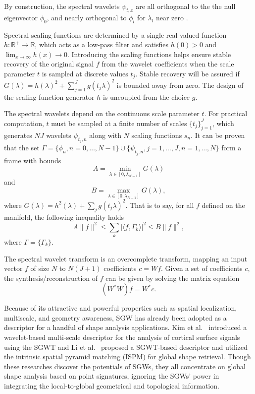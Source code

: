 By construction, the spectral wavelets $\psi_{t,x}$ are all orthogonal to the the null eigenvector $\phi_0$,
and nearly orthogonal to $\phi_l$ for $\lambda_l$ near zero \cite{Hammond2011}.

Spectral scaling functions are determined by a single real valued function $h:\mathbb{R}^+\to\mathbb{R}$,
which acts as a low-pass filter and satisfies $h(0)>0$ and $\lim_{x\to\infty}h(x)\to 0$.
Introducing the scaling functions helps ensure stable recovery of the original signal $f$ from the wavelet
coefficients when the scale parameter $t$ is sampled at discrete values ${t_j}$.
Stable recovery will be assured if $G(\lambda)=h(\lambda)^2+\sum_{j=1}^J g(t_j\lambda)^2$ is
bounded away from zero. The design of the scaling function generator $h$ is uncoupled from the choice $g$.

The spectral wavelets depend on the continuous scale parameter $t$. For practical computation,
$t$ must be sampled at a finite number of scales $\{t_j\}_{j=1}^J$, which generates
$NJ$ wavelets $\psi_{t_j,n}$ along with $N$ scaling functions $s_n$. It can be proven~\cite{Hammond2011}
that the set $\Gamma=\{\phi_n,n=0,\ldots,N-1\}\cup\{\psi_{t_j,n},j=1,\ldots,J,n=1,\ldots,N\}$
form a frame with bounds
\begin{equation*}
A=\min_{\lambda\in[0,\lambda_{N-1}]}G(\lambda)
\end{equation*}
and
\begin{equation*}
B=\max_{\lambda\in[0,\lambda_{N-1}]}G(\lambda),
\end{equation*}
where $G(\lambda)=h^2(\lambda)+\sum_j g(t_j\lambda)^2$. That is to say, for all $f$ defined on the manifold, the following inequality holds
\begin{equation}
A\|f\|^2\leq\sum_k|\langle f,\Gamma_k\rangle|^2\leq B\|f\|^2,
\end{equation}
where $\Gamma=\{\Gamma_k\}$.

The spectral wavelet transform is an overcomplete transform, mapping
an input vector $f$ of size $N$ to $N(J+1)$ coefficients $c=Wf$.
Given a set of coefficients $c$, the synthesis/reconstruction of $f$ can be given by solving the matrix equation
\begin{equation}
(W^*W)f=W^*c.
\end{equation}

Because of its attractive and powerful properties such as spatial localization,
multiscale, and geometry awareness, SGW has already been adopted as a descriptor
for a handful of shape analysis applications. Kim et al.~\cite{Kim:2012,Kim:2014}
introduced a wavelet-based multi-scale descriptor for the analysis of
cortical surface signals using the SGWT and Li et al.~\cite{Li:2013}
proposed a SGWT-based descriptor and utilized the intrinsic spatial
pyramid matching (ISPM) for global shape retrieval. Though these
researches discover the potentials of SGWs, they all concentrate on
global shape analysis based on point signatures, ignoring the SGWs'
power in integrating the local-to-global geometrical and topological information.

